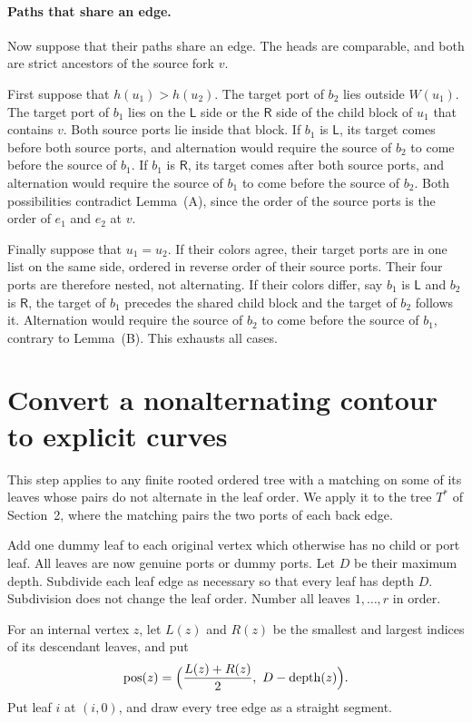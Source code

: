 \documentclass[11pt]{article}
\DeclareMathOperator{\pos}{pos}
\newcommand{\cL}{\mathsf{L}}
\newcommand{\cR}{\mathsf{R}}
\begin{document}
\paragraph{Paths that share an edge.}
Now suppose that their paths share an edge. The heads are comparable, and both
are strict ancestors of the source fork $v$.

First suppose that $h(u_1)>h(u_2)$. The target port of $b_2$ lies outside
$W(u_1)$. The target port of $b_1$ lies on the $\cL$ side or the $\cR$ side of
the child block of $u_1$ that contains $v$. Both source ports lie inside that
block. If $b_1$ is $\cL$, its target comes before both source ports, and
alternation would require the source of $b_2$ to come before the source of
$b_1$. If $b_1$ is $\cR$, its target comes after both source ports, and
alternation would require the source of $b_1$ to come before the source of
$b_2$. Both possibilities contradict Lemma~(A), since the order of the source
ports is the order of $e_1$ and $e_2$ at $v$.

Finally suppose that $u_1=u_2$. If their colors agree, their target ports are
in one list on the same side, ordered in reverse order of their source ports.
Their four ports are therefore nested, not alternating. If their colors differ,
say $b_1$ is $\cL$ and $b_2$ is $\cR$, the target of $b_1$ precedes the shared
child block and the target of $b_2$ follows it. Alternation would require the
source of $b_2$ to come before the source of $b_1$, contrary to Lemma~(B). This
exhausts all cases.

\section{Convert a nonalternating contour to explicit curves}

This step applies to any finite rooted ordered tree with a matching on some of
its leaves whose pairs do not alternate in the leaf order. We apply it to the
tree $T^*$ of Section~2, where the matching pairs the two ports of each back
edge.

Add one dummy leaf to each original vertex which otherwise has no child or port
leaf. All leaves are now genuine ports or dummy ports. Let $D$ be their maximum
depth. Subdivide each leaf edge as necessary so that every leaf has depth $D$.
Subdivision does not change the leaf order. Number all leaves $1,\ldots,r$ in
order.

For an internal vertex $z$, let $L(z)$ and $R(z)$ be the smallest and largest
indices of its descendant leaves, and put
\begin{equation*}
\pos(z)=\Bigl(\frac{L(z)+R(z)}{2},\ D-\operatorname{depth}(z)\Bigr).
\end{equation*}
Put leaf $i$ at $(i,0)$, and draw every tree edge as a straight segment.
\end{document}
